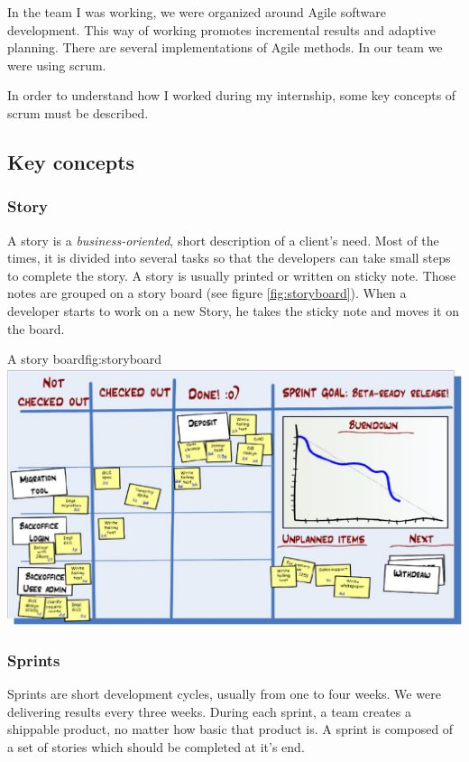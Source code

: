 In the team I was working, we were organized around Agile software
development. This way of working promotes incremental results and adaptive planning.
There are several implementations of Agile methods. In our team we were using \gls{scrum}.

In order to understand how I worked during my internship, some key concepts of \gls{scrum} must be described.

\subsection{Key concepts}

\subsubsection{Story}\label{sec:story}
A story is a \emph{business-oriented}, short description of a client's need.
Most of the times, it is divided into several tasks so that the developers
can take small steps to complete the story. A story is usually printed or
written on sticky note. Those notes are grouped on a story board (see figure
\ref{fig:storyboard}). When a developer starts to work on a new Story, he takes
the sticky note and moves it on the board.

\begin{figureGraphics}{A story board}{fig:storyboard}
    \includegraphics[width=\textwidth]{./src/img/taskboard.jpg}
\end{figureGraphics}


\subsubsection{Sprints}\label{sec:sprint}
Sprints are short development cycles, usually from one to four weeks. We were
delivering results every three weeks. During each sprint, a team creates a
shippable product, no matter how basic that product is. A sprint is composed of
a set of stories which should be completed at it's end.

